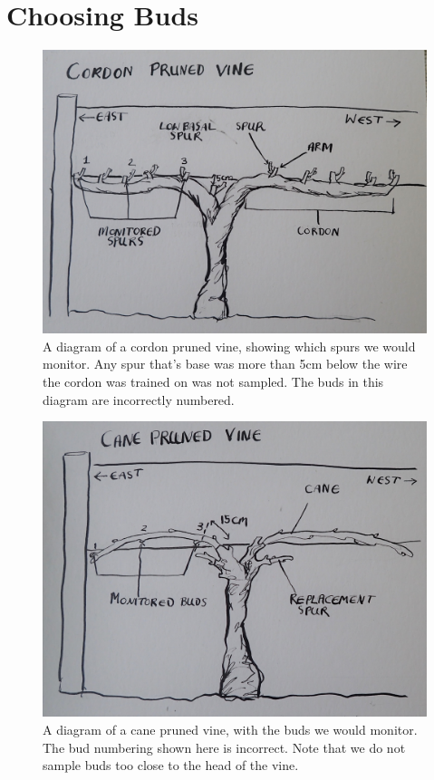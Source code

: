 \documentclass[11pt,letter]{article}
\begin{document}
\section{Choosing Buds}

\begin{figure}
  \includegraphics[width=\linewidth]{CordonPruned.jpg}
  \caption{A diagram of a cordon pruned vine, showing which spurs we would monitor. Any spur that's base was more than 5cm below the wire the cordon was trained on was not sampled. The buds in this diagram are incorrectly numbered.}
  \label{fig:CordonPruned}
\end{figure}

\begin{figure}
  \includegraphics[width=\linewidth]{CanePruned.jpg}
  \caption{A diagram of a cane pruned vine, with the buds we would monitor. The bud numbering shown here is incorrect. Note that we do not sample buds too close to the head of the vine.}
  \label{fig:CanePruned}
\end{figure}
\end{document}
